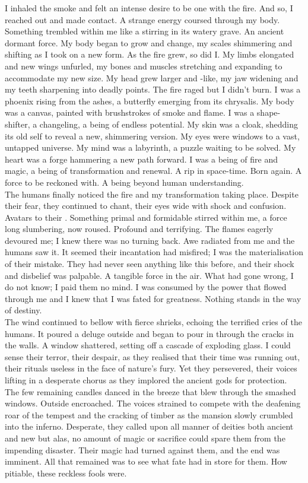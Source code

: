 I inhaled the smoke and felt an intense desire to be one with the fire. And so, I reached out and made contact. A strange energy coursed through my body. Something trembled within me like a  stirring in its watery grave. An ancient dormant force. My body began to grow and change, my scales shimmering and shifting as I took on a new form. As the fire grew, so did I. My limbs elongated and new wings unfurled, my bones and muscles stretching and expanding to accommodate my new size. My head grew larger and -like, my jaw widening and my teeth sharpening into deadly points. The fire raged but I didn't burn. I was a phoenix rising from the ashes, a butterfly emerging from its chrysalis. My body was a canvas, painted with brushstrokes of smoke and flame. I was a shape-shifter, a changeling, a being of endless potential. My skin was a cloak, shedding its old self to reveal a new, shimmering version. My eyes were windows to a vast, untapped universe. My mind was a labyrinth, a puzzle waiting to be solved. My heart was a forge hammering a new path forward. I was a being of fire and magic, a being of transformation and renewal. A rip in space-time. Born again. A force to be reckoned with. A being beyond human understanding.\\

The humans finally noticed the fire and my transformation taking place. Despite their fear, they continued to chant, their eyes wide with shock and confusion. Avatars to their . Something primal and formidable stirred within me, a force long slumbering, now roused. Profound and terrifying. The flames eagerly devoured me; I knew there was no turning back. Awe radiated from me and the humans saw it. It seemed their incantation had misfired; I was the materialisation of their mistake. They had never seen anything like this before, and their shock and disbelief was palpable. A tangible force in the air. What had gone wrong, I do not know; I paid them no mind. I was consumed by the power that flowed through me and I knew that I was fated for greatness. Nothing stands in the way of destiny.\\

The wind continued to bellow with fierce shrieks, echoing the terrified cries of the humans. It poured a deluge outside and began to pour in through the cracks in the walls. A window shattered, setting off a cascade of exploding glass. I could sense their terror, their despair, as they realised that their time was running out, their rituals useless in the face of nature's fury. Yet they persevered, their voices lifting in a desperate chorus as they implored the ancient gods for protection. The few remaining candles danced in the breeze that blew through the smashed windows. Outside encroached. The voices strained to compete with the deafening roar of the tempest and the cracking of timber as the mansion slowly crumbled into the inferno. Desperate, they called upon all manner of deities both ancient and new but alas, no amount of magic or sacrifice could spare them from the impending disaster. Their magic had turned against them, and the end was imminent. All that remained was to see what fate had in store for them. How pitiable, these reckless fools were.\\

